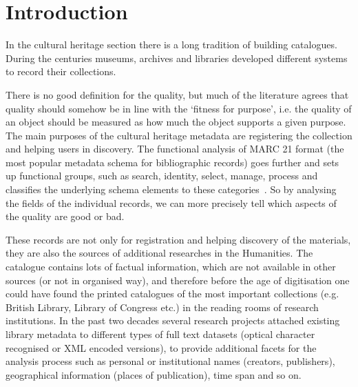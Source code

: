 \chapter{Introduction}

In the cultural heritage section there is a long tradition of building catalogues. During the centuries museums, archives and libraries developed different systems to record their collections.

There is no good definition for the quality, but much of the literature agrees that quality should somehow be in line with the `fitness for purpose', i.e. the quality of an object should be measured as how much the object supports a given purpose. The main purposes of the cultural heritage metadata are registering the collection and helping users in discovery. The functional analysis of MARC 21 format (the most popular metadata  schema for bibliographic records) goes further and sets up functional groups, such as search, identity, select, manage, process and classifies the underlying schema elements to these categories~\cite{frbr1998, delsey2003, loc2006}. So by analysing the fields of the individual records, we can more precisely tell which aspects of the quality are good or bad.

These records are not only for registration and helping discovery of the materials, they are also the sources of additional researches in the Humanities. The catalogue contains lots of factual information, which are not available in other sources (or not in organised way), and therefore before the age of digitisation one could have found the printed catalogues of the most important collections (e.g. British Library, Library of Congress etc.) in the reading rooms of research institutions. In the past two decades several research projects attached existing library metadata to different types of full text datasets (optical character recognised or XML encoded versions), to provide additional facets for the analysis process such as personal or institutional names (creators, publishers), geographical information (places of publication), time span and so on.

